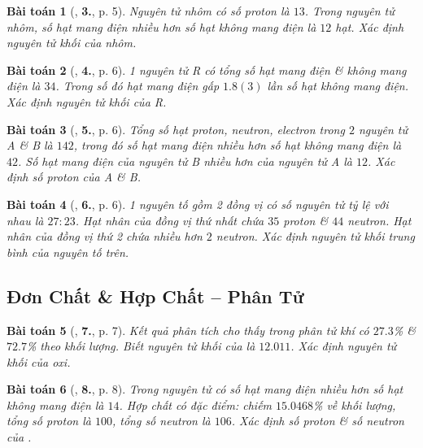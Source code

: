 \documentclass{article}
\numberwithin{equation}{section}
\newtheorem{baitoan}{Bài toán}[section]
\begin{document}
\begin{baitoan}[\cite{An2011}, \textbf{3.}, p. 5]
	Nguyên tử nhôm có số proton là $13$. Trong nguyên tử nhôm, số hạt mang điện nhiều hơn số hạt không mang điện là $12$ hạt. Xác định nguyên tử khối của nhôm.
\end{baitoan}

\begin{baitoan}[\cite{An2011}, \textbf{4.}, p. 6]
	1 nguyên tử R có tổng số hạt mang điện \& không mang điện là $34$. Trong số đó hạt mang điện gấp $1.8(3)$ lần số hạt không mang điện. Xác định nguyên tử khối của R.
\end{baitoan}

\begin{baitoan}[\cite{An2011}, \textbf{5.}, p. 6]
	Tổng số hạt proton, neutron, electron trong $2$ nguyên tử A \& B là $142$, trong đó số hạt mang điện nhiều hơn số hạt không mang điện là $42$. Số hạt mang điện của nguyên tử B nhiều hơn của nguyên tử A là $12$. Xác định số proton của A \& B.
\end{baitoan}

\begin{baitoan}[\cite{An2011}, \textbf{6.}, p. 6]
	1 nguyên tố gồm 2 đồng vị có số nguyên tử tỷ lệ với nhau là $27:23$. Hạt nhân của đồng vị thứ nhất chứa $35$ proton \& $44$ neutron. Hạt nhân của đồng vị thứ 2 chứa nhiều hơn $2$ neutron. Xác định nguyên tử khối trung bình của nguyên tố trên.
\end{baitoan}


\subsection{Đơn Chất \& Hợp Chất -- Phân Tử}

\begin{baitoan}[\cite{An2011}, \textbf{7.}, p. 7]
	Kết quả phân tích cho thấy trong phân tử khí  có $27.3$\% \& $72.7$\%  theo khối lượng. Biết nguyên tử khối của  là $12.011$. Xác định nguyên tử khối của oxi.
\end{baitoan}

\begin{baitoan}[\cite{An2011}, \textbf{8.}, p. 8]
	Trong nguyên tử  có số hạt mang điện nhiều hơn số hạt không mang điện là $14$. Hợp chất  có đặc điểm:  chiếm $15.0468$\% về khối lượng, tổng số proton là $100$, tổng số neutron là $106$. Xác định số proton \& số neutron của .
\end{baitoan}
\end{document}
